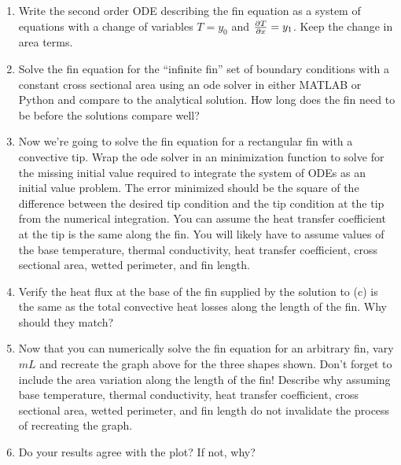 \documentclass[12pt,letterpaper]{article}
\begin{document}
\begin{enumerate}
	\begin{enumerate}
		\item Write the second order ODE describing the fin equation as a system of equations with a change of variables $T = y_0$ and $\frac{\partial T}{\partial x} = y_1$.
		Keep the change in area terms.
		\item Solve the fin equation for the ``infinite fin'' set of boundary conditions with a constant cross sectional area using an ode solver in either MATLAB or Python and compare to the analytical solution.
		How long does the fin need to be before the solutions compare well?
		\item Now we're going to solve the fin equation for a rectangular fin with a convective tip.
		Wrap the ode solver in an minimization function to solve for the missing initial value required to integrate the system of ODEs as an initial value problem.
		The error minimized should be the square of the difference between the desired tip condition and the tip condition at the tip from the numerical integration.
		You can assume the heat transfer coefficient at the tip is the same along the fin.
		You will likely have to assume values of the base temperature, thermal conductivity, heat transfer coefficient, cross sectional area, wetted perimeter, and fin length.
		\item Verify the heat flux at the base of the fin supplied by the solution to (c) is the same as the total convective heat losses along the length of the fin.
		Why should they match?
		\item Now that you can numerically solve the fin equation for an arbitrary fin, vary $m L$ and recreate the graph above for the three shapes shown.
		Don't forget to include the area variation along the length of the fin!
		Describe why assuming base temperature, thermal conductivity, heat transfer coefficient, cross sectional area, wetted perimeter, and fin length do not invalidate the process of recreating the graph.
		\item Do your results agree with the plot?
		If not, why?
	\end{enumerate}

\end{enumerate}
\end{document}
